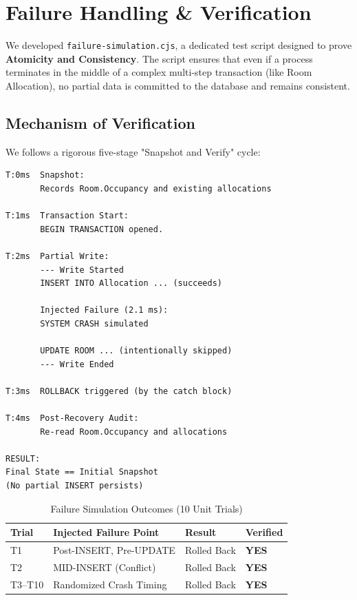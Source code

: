\documentclass[sigconf]{acmart}
\newcommand{\theadbf}[1]{\textbf{#1}}
\begin{document}


\section{Failure Handling \& Verification}

We developed \texttt{failure-simulation.cjs}, a dedicated test script designed to prove \textbf{Atomicity and Consistency}. The script ensures that even if a process terminates in the middle of a complex multi-step transaction (like Room Allocation), no partial data is committed to the database and remains consistent.

\subsection{Mechanism of Verification}
We follows a rigorous five-stage "Snapshot and Verify" cycle:

\begin{lstlisting}[style=logstyle, caption={Snapshot and Verify Cycle (Failure Simulation)}]
T:0ms  Snapshot:
       Records Room.Occupancy and existing allocations

T:1ms  Transaction Start:
       BEGIN TRANSACTION opened.

T:2ms  Partial Write:
       --- Write Started
       INSERT INTO Allocation ... (succeeds)
    
       Injected Failure (2.1 ms):
       SYSTEM CRASH simulated
       
       UPDATE ROOM ... (intentionally skipped)
       --- Write Ended

T:3ms  ROLLBACK triggered (by the catch block)

T:4ms  Post-Recovery Audit:
       Re-read Room.Occupancy and allocations

RESULT:
Final State == Initial Snapshot
(No partial INSERT persists)
\end{lstlisting}

\begin{table}[H]
\centering
\caption{Failure Simulation Outcomes (10 Unit Trials)}
\label{tab:failure-log}
\small
\renewcommand{\arraystretch}{1.1}
\begin{tabular}{|L{0.9cm}|L{3.1cm}|L{1.5cm}|L{1.2cm}|}
\hline
{}\color{white}\theadbf{Trial} & \color{white}\theadbf{Injected Failure Point} & \color{white}\theadbf{Result} & \color{white}\theadbf{Verified} \\
\hline
T1 & Post-INSERT, Pre-UPDATE & Rolled Back & \textbf{YES} \\
\hline
T2 & MID-INSERT (Conflict) & Rolled Back & \textbf{YES} \\
\hline
T3--T10 & Randomized Crash Timing & Rolled Back & \textbf{YES} \\
\hline
\end{tabular}
\end{table}
\end{document}
